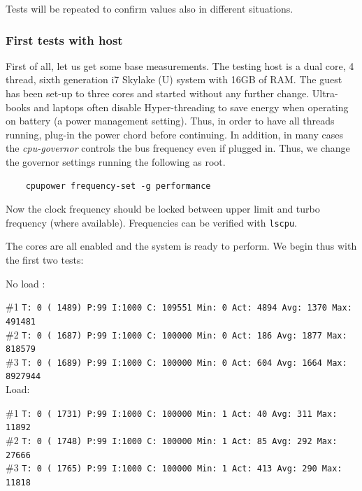 \documentclass[]{scrartcl}
\begin{document}
Tests will be repeated to confirm values also in different situations.

\subsubsection{First tests with host}

First of all, let us get some base measurements. The testing host is a dual core, 4 thread, sixth generation i7 Skylake (U) system with 16GB of RAM. The guest has been set-up to three cores
and started without any further change. 
Ultra-books and laptops often disable Hyper-threading to save energy when operating on battery (a power management setting). Thus, in order to have all threads running, plug-in the power chord before continuing.
In addition, in many cases the \textit{cpu-governor} controls the bus frequency even if plugged in. Thus, we change the governor settings running the following as root. 

\begin{verbatim}
	cpupower frequency-set -g performance
\end{verbatim}

Now the clock frequency should be locked between upper limit and turbo frequency (where available). Frequencies can be verified with \texttt{lscpu}. 

The cores are all enabled and the system is ready to perform.
We begin thus with the first two tests:

\bigskip

\noindent No load :

\noindent \small \#1 \texttt{T: 0 ( 1489) P:99 I:1000 C: 109551 Min: 0 Act: 4894 Avg: 1370 Max:  491481}\\
\noindent \small \#2 \texttt{T: 0 ( 1687) P:99 I:1000 C: 100000 Min: 0 Act:  186 Avg: 1877 Max:  818579}\\
\noindent \small \#3 \texttt{T: 0 ( 1689) P:99 I:1000 C: 100000 Min: 0 Act:  604 Avg: 1664 Max:  8927944}\\

\noindent Load:

\noindent \small \#1 \texttt{T: 0 ( 1731) P:99 I:1000 C: 100000 Min: 1 Act:   40 Avg:  311 Max:   11892}\\
\noindent \small \#2 \texttt{T: 0 ( 1748) P:99 I:1000 C: 100000 Min: 1 Act:   85 Avg:  292 Max:   27666}\\
\noindent \small \#3 \texttt{T: 0 ( 1765) P:99 I:1000 C: 100000 Min: 1 Act:  413 Avg:  290 Max:   11818}
\end{document}
